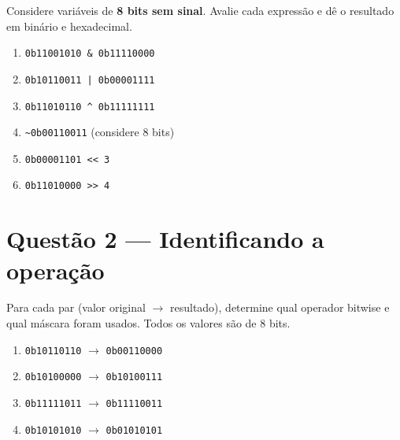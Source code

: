 \documentclass[12pt,a4paper]{article}
\newif\ifmostrarrespostas
\begin{document}
Considere variáveis de \textbf{8 bits sem sinal}. Avalie cada expressão e dê o resultado em binário e hexadecimal.

\begin{multicols}{2}
\begin{enumerate}[label=\alph*)]
  \item \texttt{0b11001010 \& 0b11110000}
  \item \texttt{0b10110011 | 0b00001111}
  \item \texttt{0b11010110 \^{} 0b11111111}
  \item \texttt{\~{}0b00110011} (considere 8 bits)
  \item \texttt{0b00001101 << 3}
  \item \texttt{0b11010000 >> 4}
\end{enumerate}
\end{multicols}

\ifmostrarrespostas
\begin{tcolorbox}[colback=red!5, colframe=red!40, title=\textbf{Resposta --- Questão 1}, fonttitle=\small]
\small
\begin{multicols}{2}
\begin{enumerate}[label=\alph*)]
  \item \texttt{0b11000000} = \texttt{0xC0}
  \item \texttt{0b10111111} = \texttt{0xBF}
  \item \texttt{0b00101001} = \texttt{0x29}
  \item \texttt{0b11001100} = \texttt{0xCC}
  \item \texttt{0b01101000} = \texttt{0x68}
  \item \texttt{0b00001101} = \texttt{0x0D}
\end{enumerate}
\end{multicols}
\end{tcolorbox}
\fi

\section{Questão 2 --- Identificando a operação}

Para cada par (valor original $\rightarrow$ resultado), determine qual operador bitwise e qual máscara foram usados. Todos os valores são de 8 bits.

\begin{multicols}{2}
\begin{enumerate}[label=\alph*)]
  \item \texttt{0b10110110} $\rightarrow$ \texttt{0b00110000}
  \item \texttt{0b10100000} $\rightarrow$ \texttt{0b10100111}
  \item \texttt{0b11111011} $\rightarrow$ \texttt{0b11110011}
  \item \texttt{0b10101010} $\rightarrow$ \texttt{0b01010101}
\end{enumerate}
\end{multicols}
\end{document}
